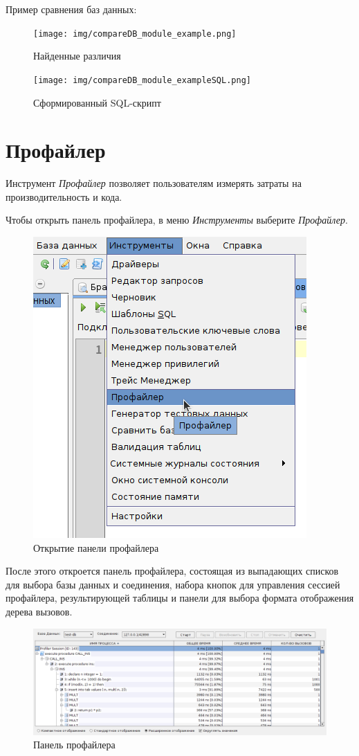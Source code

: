 Пример сравнения баз данных:
\begin{figure}[H]
	\centering
	\texttt{[image: img/compareDB\_module\_example.png]}
	\caption{Найденные различия}
\end{figure}

\begin{figure}[H]
	\centering
	\texttt{[image: img/compareDB\_module\_exampleSQL.png]}
	\caption{Сформированный SQL-скрипт}
\end{figure}

\newpage

\section{Профайлер}\label{sec:profiler}

Инструмент \textit{Профайлер} позволяет пользователям измерять затраты на производительность  и  кода. 

Чтобы открыть панель профайлера, в меню \textit{Инструменты} выберите \textit{Профайлер}. 

\begin{figure}[H]
	\centering
	\includegraphics[width = 0.5\linewidth]{img/open_profiler_module.png}
	\caption{Открытие панели профайлера}
\end{figure}

После этого откроется панель профайлера, состоящая из выпадающих списков для выбора базы данных и соединения, набора кнопок для управления сессией профайлера, результирующей таблицы и панели для выбора формата отображения дерева вызовов.

\begin{figure}[H]
	\centering
	\includegraphics[width = 1\linewidth]{img/profiler_expanded_data_display.png}
	\caption{Панель профайлера}
\end{figure}

